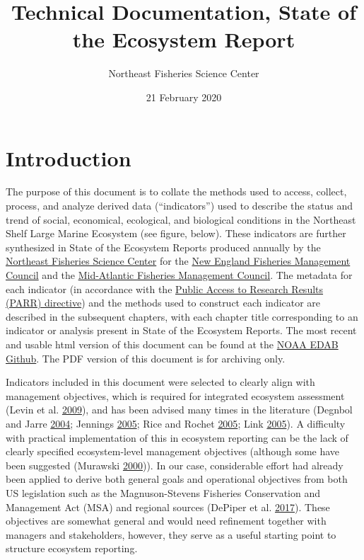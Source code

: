 \documentclass[
]{book}
\title{Technical Documentation, State of the Ecosystem Report}
\author{Northeast Fisheries Science Center}
\date{21 February 2020}
\begin{document}
\maketitle

{
\setcounter{tocdepth}{1}
\tableofcontents
}
\hypertarget{introduction}{%
\chapter*{Introduction}\label{introduction}}

The purpose of this document is to collate the methods used to access, collect, process, and analyze derived data (``indicators'') used to describe the status and trend of social, economical, ecological, and biological conditions in the Northeast Shelf Large Marine Ecosystem (see figure, below). These indicators are further synthesized in State of the Ecosystem Reports produced annually by the \href{https://www.nefsc.noaa.gov/}{Northeast Fisheries Science Center} for the \href{https://www.nefmc.org/}{New England Fisheries Management Council} and the \href{http://www.mafmc.org/}{Mid-Atlantic Fisheries Management Council}. The metadata for each indicator (in accordance with the \href{http://obamawhitehouse.archives.gov/sites/default/files/microsites/ostp/ostp_public_access_memo_2013.pdf}{Public Access to Research Results (PARR) directive}) and the methods used to construct each indicator are described in the subsequent chapters, with each chapter title corresponding to an indicator or analysis present in State of the Ecosystem Reports. The most recent and usable html version of this document can be found at the \href{https://noaa-edab.github.io/tech-doc/}{NOAA EDAB Github}. The PDF version of this document is for archiving only.

Indicators included in this document were selected to clearly align with management objectives, which is required for integrated ecosystem assessment (Levin et al. \protect\hyperlink{ref-levin_integrated_2009}{2009}), and has been advised many times in the literature (Degnbol and Jarre \protect\hyperlink{ref-degnbol_review_2004}{2004}; Jennings \protect\hyperlink{ref-jennings_indicators_2005}{2005}; Rice and Rochet \protect\hyperlink{ref-rice_framework_2005}{2005}; Link \protect\hyperlink{ref-link_translating_2005}{2005}). A difficulty with practical implementation of this in ecosystem reporting can be the lack of clearly specified ecosystem-level management objectives (although some have been suggested (Murawski \protect\hyperlink{ref-murawski_definitions_2000}{2000})). In our case, considerable effort had already been applied to derive both general goals and operational objectives from both US legislation such as the Magnuson-Stevens Fisheries Conservation and Management Act (MSA) and regional sources (DePiper et al. \protect\hyperlink{ref-depiper_operationalizing_2017}{2017}). These objectives are somewhat general and would need refinement together with managers and stakeholders, however, they serve as a useful starting point to structure ecosystem reporting.
\end{document}
